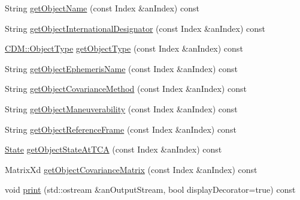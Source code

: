 \begin{DoxyCompactItemize}
\item 
String \hyperlink{classostk_1_1astro_1_1conjunction_1_1messages_1_1ccsds_1_1_c_d_m_a193a38d7c617e9939484ee28b71bd102}{get\+Object\+Name} (const Index \&an\+Index) const
\item 
String \hyperlink{classostk_1_1astro_1_1conjunction_1_1messages_1_1ccsds_1_1_c_d_m_a9789c4364467b7669d5fd63fba25cf5a}{get\+Object\+International\+Designator} (const Index \&an\+Index) const
\item 
\hyperlink{classostk_1_1astro_1_1conjunction_1_1messages_1_1ccsds_1_1_c_d_m_a9ef446f2327904fc0516249120ec9d71}{C\+D\+M\+::\+Object\+Type} \hyperlink{classostk_1_1astro_1_1conjunction_1_1messages_1_1ccsds_1_1_c_d_m_a2648441cd3ca2d768d0b332e3fea8026}{get\+Object\+Type} (const Index \&an\+Index) const
\item 
String \hyperlink{classostk_1_1astro_1_1conjunction_1_1messages_1_1ccsds_1_1_c_d_m_a17433975239d4a9be39de9134e51894b}{get\+Object\+Ephemeris\+Name} (const Index \&an\+Index) const
\item 
String \hyperlink{classostk_1_1astro_1_1conjunction_1_1messages_1_1ccsds_1_1_c_d_m_abe474c1a7ca51045e47c753c2e0e226b}{get\+Object\+Covariance\+Method} (const Index \&an\+Index) const
\item 
String \hyperlink{classostk_1_1astro_1_1conjunction_1_1messages_1_1ccsds_1_1_c_d_m_a4fc6a3384890598b1cfada26ec56e738}{get\+Object\+Maneuverability} (const Index \&an\+Index) const
\item 
String \hyperlink{classostk_1_1astro_1_1conjunction_1_1messages_1_1ccsds_1_1_c_d_m_a274eb98bbdf4b25b2dec33438ce0f0f2}{get\+Object\+Reference\+Frame} (const Index \&an\+Index) const
\item 
\hyperlink{classostk_1_1astro_1_1trajectory_1_1_state}{State} \hyperlink{classostk_1_1astro_1_1conjunction_1_1messages_1_1ccsds_1_1_c_d_m_aa0515281ff803e871d4865dc6e49d6ae}{get\+Object\+State\+At\+T\+CA} (const Index \&an\+Index) const
\item 
Matrix\+Xd \hyperlink{classostk_1_1astro_1_1conjunction_1_1messages_1_1ccsds_1_1_c_d_m_aeb251c6893a475cf33a9d90ffa433423}{get\+Object\+Covariance\+Matrix} (const Index \&an\+Index) const
\item 
void \hyperlink{classostk_1_1astro_1_1conjunction_1_1messages_1_1ccsds_1_1_c_d_m_adea2a7c079bb4666c03df1ecefd687a3}{print} (std\+::ostream \&an\+Output\+Stream, bool display\+Decorator=true) const
\end{DoxyCompactItemize}
